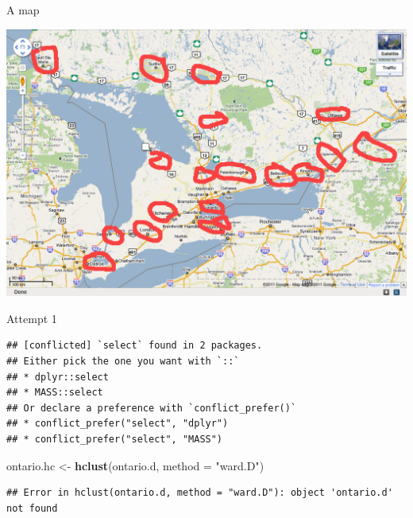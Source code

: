 \documentclass[ignorenonframetext,]{beamer}
\newenvironment{Shaded}{\begin{snugshade}}{\end{snugshade}}
\newcommand{\DataTypeTok}[1]{\textcolor[rgb]{0.13,0.29,0.53}{#1}}
\newcommand{\DecValTok}[1]{\textcolor[rgb]{0.00,0.00,0.81}{#1}}
\newcommand{\KeywordTok}[1]{\textcolor[rgb]{0.13,0.29,0.53}{\textbf{#1}}}
\newcommand{\NormalTok}[1]{#1}
\newcommand{\OperatorTok}[1]{\textcolor[rgb]{0.81,0.36,0.00}{\textbf{#1}}}
\newcommand{\StringTok}[1]{\textcolor[rgb]{0.31,0.60,0.02}{#1}}
\begin{document}
\begin{frame}{A map}
\protect\hypertarget{a-map}{}

\includegraphics{map1.png}

\end{frame}

\begin{frame}[fragile]{Attempt 1}
\protect\hypertarget{attempt-1}{}

\begin{Shaded}
\end{Shaded}

\begin{verbatim}
## [conflicted] `select` found in 2 packages.
## Either pick the one you want with `::` 
## * dplyr::select
## * MASS::select
## Or declare a preference with `conflict_prefer()`
## * conflict_prefer("select", "dplyr")
## * conflict_prefer("select", "MASS")
\end{verbatim}

\begin{Shaded}
\begin{Highlighting}[]
\NormalTok{ontario.hc <-}\StringTok{ }\KeywordTok{hclust}\NormalTok{(ontario.d, }\DataTypeTok{method =} \StringTok{"ward.D"}\NormalTok{)}
\end{Highlighting}
\end{Shaded}

\begin{verbatim}
## Error in hclust(ontario.d, method = "ward.D"): object 'ontario.d' not found
\end{verbatim}

\end{frame}
\end{document}

